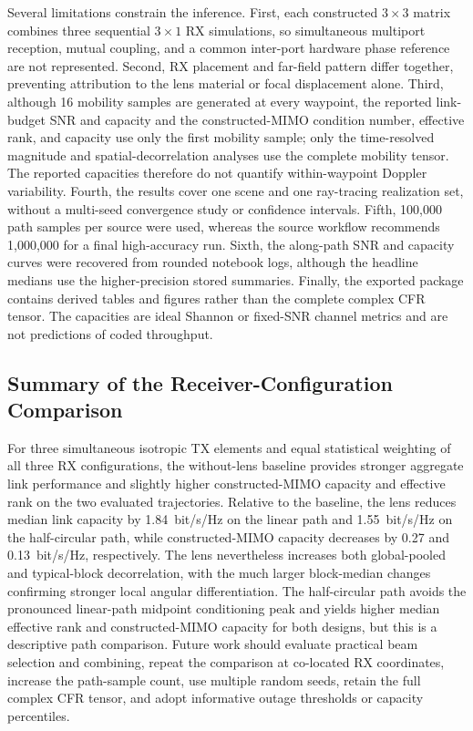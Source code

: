 Several limitations constrain the inference. First, each constructed $3\times3$ matrix combines three sequential $3\times1$ RX simulations, so simultaneous multiport reception, mutual coupling, and a common inter-port hardware phase reference are not represented. Second, RX placement and far-field pattern differ together, preventing attribution to the lens material or focal displacement alone. Third, although 16 mobility samples are generated at every waypoint, the reported link-budget SNR and capacity and the constructed-MIMO condition number, effective rank, and capacity use only the first mobility sample; only the time-resolved magnitude and spatial-decorrelation analyses use the complete mobility tensor. The reported capacities therefore do not quantify within-waypoint Doppler variability. Fourth, the results cover one scene and one ray-tracing realization set, without a multi-seed convergence study or confidence intervals. Fifth, 100{,}000 path samples per source were used, whereas the source workflow recommends 1{,}000{,}000 for a final high-accuracy run. Sixth, the along-path SNR and capacity curves were recovered from rounded notebook logs, although the headline medians use the higher-precision stored summaries. Finally, the exported package contains derived tables and figures rather than the complete complex CFR tensor. The capacities are ideal Shannon or fixed-SNR channel metrics and are not predictions of coded throughput.

\subsection{Summary of the Receiver-Configuration Comparison}

For three simultaneous isotropic TX elements and equal statistical weighting of all three RX configurations, the without-lens baseline provides stronger aggregate link performance and slightly higher constructed-MIMO capacity and effective rank on the two evaluated trajectories. Relative to the baseline, the lens reduces median link capacity by 1.84~bit/s/Hz on the linear path and 1.55~bit/s/Hz on the half-circular path, while constructed-MIMO capacity decreases by 0.27 and 0.13~bit/s/Hz, respectively. The lens nevertheless increases both global-pooled and typical-block decorrelation, with the much larger block-median changes confirming stronger local angular differentiation. The half-circular path avoids the pronounced linear-path midpoint conditioning peak and yields higher median effective rank and constructed-MIMO capacity for both designs, but this is a descriptive path comparison. Future work should evaluate practical beam selection and combining, repeat the comparison at co-located RX coordinates, increase the path-sample count, use multiple random seeds, retain the full complex CFR tensor, and adopt informative outage thresholds or capacity percentiles.

